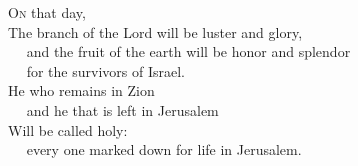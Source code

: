 
\lettrine{O}{n} that day,\\
The branch of the Lord will be luster and glory,\\
   and the fruit of the earth will be honor and splendor\\
   for the survivors of Israel.\\
He who remains in Zion\\
   and he that is left in Jerusalem\\
Will be called holy:\\
   every one marked down for life in Jerusalem.
